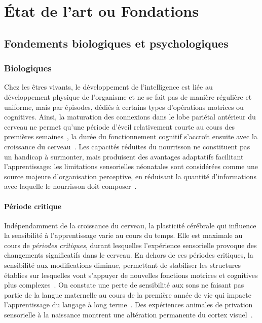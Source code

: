\chapter{État de l’art ou Fondations}

\section{Fondements biologiques et psychologiques}

\subsection{Biologiques}
Chez les êtres vivants, le développement de l'intelligence est liée au développement physique de l'organisme et ne se fait pas de manière régulière et uniforme, mais par épisodes, dédiés à certains types d'opérations motrices ou cognitives.
Ainsi, la maturation des connexions dans le lobe pariétal antérieur du cerveau ne permet qu'une période d'éveil relativement courte au cours des premières semaines~\cite{dehaene2024perceptual}, la durée du fonctionnement cognitif s'accroît ensuite avec la croissance du cerveau~\cite{gale2004critical}. Les capacités réduites du nourrisson ne constituent pas un handicap à surmonter, mais produisent des avantages adaptatifs facilitant l'apprentissage: les limitations sensorielles néonatales sont considérées comme une source majeure d'organisation perceptive, en réduisant la quantité d'informations avec laquelle le nourrisson doit composer~\cite{turkewitz1982limitations}.


\subsubsection{Période critique}
Indépendamment de la croissance du cerveau, la plasticité cérébrale qui influence la sensibilité à l'apprentissage varie au cours du temps. Elle est maximale au cours de \emph{périodes critiques}, durant lesquelles l'expérience sensorielle provoque des changements significatifs dans le cerveau.
En dehors de ces périodes critiques, la sensibilité aux modifications diminue, permettant de stabiliser les structures établies sur lesquelles vont s'appuyer de nouvelles fonctions motrices et cognitives plus complexes~\cite{cisneros2020critical}. On constate une perte de sensibilité aux sons ne faisant pas partie de la langue maternelle au cours de la première année de vie qui impacte l'apprentissage du langage à long terme~\cite{werker1984cross}. Des expériences animales de privation sensorielle à la naissance montrent une altération permanente du cortex visuel~\cite{hubel1963receptive}. 


